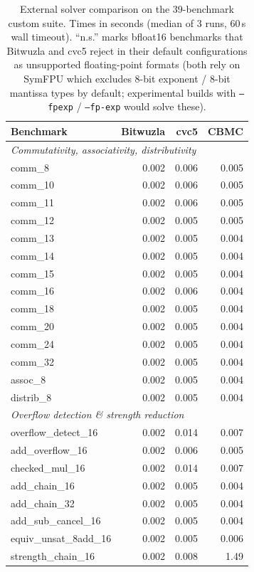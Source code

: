 \documentclass[runningheads]{llncs}
\newcommand{\cbmc}{\textsc{CBMC}\xspace}
\begin{document}
\begin{table}[ht]
\caption{External solver comparison on the 39-benchmark custom
  suite. Times in seconds (median of 3 runs, 60\,s wall timeout).
  ``n.s.'' marks bfloat16 benchmarks that Bitwuzla and cvc5 reject
  in their default configurations as unsupported floating-point
  formats (both rely on SymFPU which excludes 8-bit exponent /
  8-bit mantissa types by default; experimental builds with
  \texttt{--fpexp} / \texttt{--fp-exp} would solve these).}
\label{tab:external}
\centering
\small
\begin{tabular}{lrrr}
\toprule
Benchmark & Bitwuzla & cvc5 & \cbmc \\
\midrule
\multicolumn{4}{l}{\emph{Commutativity, associativity, distributivity}} \\
comm\_8 & 0.002 & 0.006 & 0.005 \\
comm\_10 & 0.002 & 0.006 & 0.005 \\
comm\_11 & 0.002 & 0.006 & 0.005 \\
comm\_12 & 0.002 & 0.005 & 0.005 \\
comm\_13 & 0.002 & 0.005 & 0.004 \\
comm\_14 & 0.002 & 0.005 & 0.004 \\
comm\_15 & 0.002 & 0.005 & 0.004 \\
comm\_16 & 0.002 & 0.006 & 0.004 \\
comm\_18 & 0.002 & 0.005 & 0.004 \\
comm\_20 & 0.002 & 0.005 & 0.004 \\
comm\_24 & 0.002 & 0.005 & 0.004 \\
comm\_32 & 0.002 & 0.005 & 0.004 \\
assoc\_8 & 0.002 & 0.005 & 0.004 \\
distrib\_8 & 0.002 & 0.005 & 0.004 \\
\midrule
\multicolumn{4}{l}{\emph{Overflow detection \& strength reduction}} \\
overflow\_detect\_16 & 0.002 & 0.014 & 0.007 \\
add\_overflow\_16 & 0.002 & 0.006 & 0.005 \\
checked\_mul\_16 & 0.002 & 0.014 & 0.007 \\
add\_chain\_16 & 0.002 & 0.005 & 0.004 \\
add\_chain\_32 & 0.002 & 0.005 & 0.004 \\
add\_sub\_cancel\_16 & 0.002 & 0.005 & 0.004 \\
equiv\_unsat\_8add\_16 & 0.002 & 0.005 & 0.006 \\
strength\_chain\_16 & 0.002 & 0.008 & 1.49 \\

\end{tabular}
\end{table}
\end{document}

